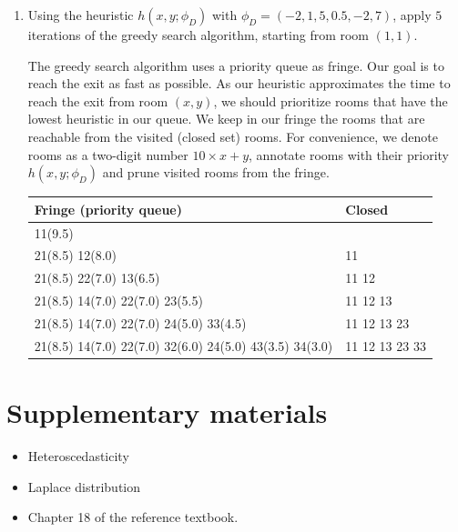 \documentclass[11pt, a4paper]{article}
\begin{document}
\begin{enumerate}
    \item Using the heuristic $h(x, y; \phi_D)$ with $\phi_D = (-2, 1, 5, 0.5, -2, 7)$, apply $5$ iterations of the greedy search algorithm, starting from room $(1, 1)$.

    \begin{solution}
        The greedy search algorithm uses a priority queue as fringe. Our goal is to reach the exit as fast as possible. As our heuristic approximates the time to reach the exit from room $(x, y)$, we should prioritize rooms that have the lowest heuristic in our queue. We keep in our fringe the rooms that are reachable from the visited (closed set) rooms. For convenience, we denote rooms as a two-digit number $10 \times x + y$, annotate rooms with their priority $h(x, y; \phi_D)$ and prune visited rooms from the fringe.

        \begin{table}[H]
            \centering
            \begin{tabular}{l|l}
                \toprule
                Fringe (priority queue) & Closed \\
                \midrule
                11(9.5) & \\
                21(8.5) 12(8.0) & 11 \\
                21(8.5) 22(7.0) 13(6.5) & 11 12 \\
                21(8.5) 14(7.0) 22(7.0) 23(5.5) & 11 12 13\\
                21(8.5) 14(7.0) 22(7.0) 24(5.0) 33(4.5) & 11 12 13 23 \\
                21(8.5) 14(7.0) 22(7.0) 32(6.0) 24(5.0) 43(3.5) 34(3.0) & 11 12 13 23 33 \\
                \bottomrule
            \end{tabular}
        \end{table}
    \end{solution}
\end{enumerate}

\newpage

\section*{Supplementary materials}

\begin{itemize}
    \item Heteroscedasticity


    \item Laplace distribution


    \item Chapter 18 of the reference textbook.
\end{itemize}
\end{document}
